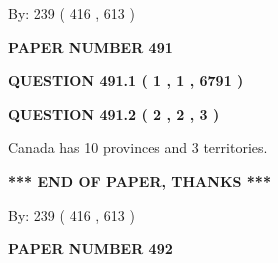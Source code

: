 \documentclass[12pt]{article}
\begin{document}
   
\hspace{1.0in} By: 
 239 ( 416 ,  613 )
   
   
   
   
\newpage 
\setcounter{page}{ 
   491001 } 
   
   
   
   
 {\textbf{ \Large{ PAPER NUMBER  491  }}}
   
   
\vspace{0.2in}
   
   
   
   
   
   
 \vspace{0.2in}
 
 
 
 
   
   
  
\vspace{0.2in}
  
{\textbf{\Large{QUESTION
491.1 
 ( 1 , 1 , 6791 )
}}}
  
  
  
\vspace{0.2in}
  
{\textbf{\Large{QUESTION
491.2 
 ( 2 , 2 , 3 )
}}}
  
  
 
 
\noindent{}
 
 
Canada has 10  provinces and 3 territories.
 
 
 
 
   
   
 \vspace{0.2in}
 
   
   
   
   
\vspace{1.0in} 
{\textbf{\large{ *** END OF PAPER, THANKS *** }}} 
   
   
\hspace{1.0in} By: 
 239 ( 416 ,  613 )
   
   
   
   
\newpage 
\setcounter{page}{ 
   492001 } 
   
   
   
   
 {\textbf{ \Large{ PAPER NUMBER  492  }}}
   
\end{document}
